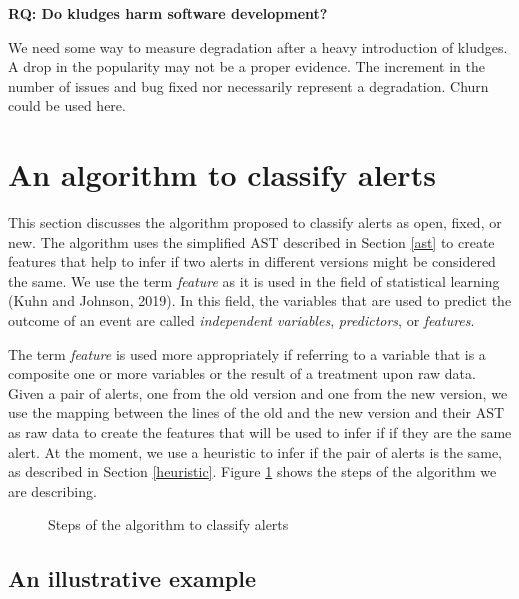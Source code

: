 \documentclass[
]{article}
\begin{document}
\noindent \textbf{RQ: Do kludges harm software development?}
\label{kludge_harm}

We need some way to measure degradation after a heavy introduction of
kludges. A drop in the popularity may not be a proper evidence. The
increment in the number of issues and bug fixed nor necessarily
represent a degradation. Churn could be used here.


\section{An algorithm to classify alerts}
\label{alg}

This section discusses the algorithm proposed to classify alerts as open, fixed,
or new. The algorithm uses the simplified AST described in Section
\ref{ast} to create features that help to infer if two alerts in
different versions might be considered the same. We use the term
\textit{feature} as it is used in the field of statistical learning
(Kuhn and Johnson, 2019). In this field, the variables that are used to
predict the outcome of an event are called \emph{independent variables},
\emph{predictors}, or \emph{features}.

The term \emph{feature} is used more appropriately if referring to a
variable that is a composite one or more variables or the result of a
treatment upon raw data. Given a pair of alerts, one from the old
version and one from the new version, we use the mapping between the
lines of the old and the new version and their AST as raw data to create
the features that will be used to infer if if they are the same alert.
At the moment, we use a heuristic to infer if the pair of alerts is the
same, as described in Section \ref{heuristic}. Figure \ref{fig:diag}
shows the steps of the algorithm we are describing.

\begin{figure}
  \small
  \centering
  \caption{Steps of the algorithm to classify alerts}\label{fig:diag}
\end{figure}

\subsection{An illustrative example}\label{source_used}
\end{document}
